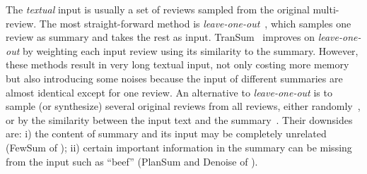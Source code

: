 

The {\em textual} input is usually a set of reviews sampled 
from the original multi-review. 
The most straight-forward method is {\em leave-one-out}~\cite{Copycat20}, 
which samples one review as summary and takes the rest as input. 
TranSum~\cite{transsum21} improves on {\em leave-one-out} by weighting 
each input review using its similarity to the summary.
However, these methods result in very long textual input, not only costing
more memory but also introducing some noises because the input of 
different summaries are almost identical except for one review.
An alternative to {\em leave-one-out} is to sample (or synthesize) several 
original reviews from all reviews, 
either randomly~\cite{Fewshot20}, or by the similarity between the input text and
the summary~\cite{Denoise20,Plansum20}.
Their downsides are: i) the content of summary and its input may be completely unrelated  (FewSum of ); ii) certain important information in the summary can be missing from the input such as ``beef'' (PlanSum and Denoise of ).

